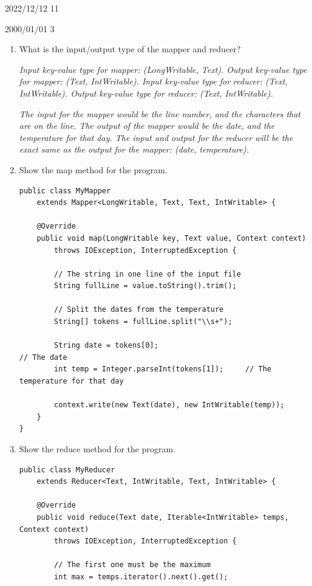 \documentclass[11pt]{article}
\begin{document}
\begin{enumerate}
		2022/12/12  11

		2000/01/01  3


		\begin{enumerate}
			\item What is the input/output type of the mapper and reducer?
				
				\textit{Input key-value type for mapper: (LongWritable, Text). 
				Output key-value type for mapper: (Text, IntWritable). 
				Input key-value type for reducer: (Text, IntWritable). 
				Output key-value type for reducer: (Text, IntWritable).}

				\textit{The input for the mapper would be the line number, and the 
				characters that are on the line. The output of the mapper would be 
				the date, and the temperature for that day. The input and output for 
				the reducer will be the exact same as the output for the mapper: 
				(date, temperature).}


			\item Show the map method for the program.
				
\begin{lstlisting}
public class MyMapper 
	extends Mapper<LongWritable, Text, Text, IntWritable> {

	@Override
	public void map(LongWritable key, Text value, Context context) 
		throws IOException, InterruptedException {

		// The string in one line of the input file
		String fullLine = value.toString().trim();

		// Split the dates from the temperature
		String[] tokens = fullLine.split("\\s+");
	
		String date = tokens[0];									// The date
		int temp = Integer.parseInt(tokens[1]);		// The temperature for that day

		context.write(new Text(date), new IntWritable(temp));
	}
}
\end{lstlisting}

			\item Show the reduce method for the program.
				
\begin{lstlisting}
public class MyReducer 
	extends Reducer<Text, IntWritable, Text, IntWritable> {

	@Override
	public void reduce(Text date, Iterable<IntWritable> temps, Context context) 
		throws IOException, InterruptedException {

		// The first one must be the maximum
		int max = temps.iterator().next().get();
	

\end{lstlisting}
\end{enumerate}
\end{enumerate}
\end{document}
